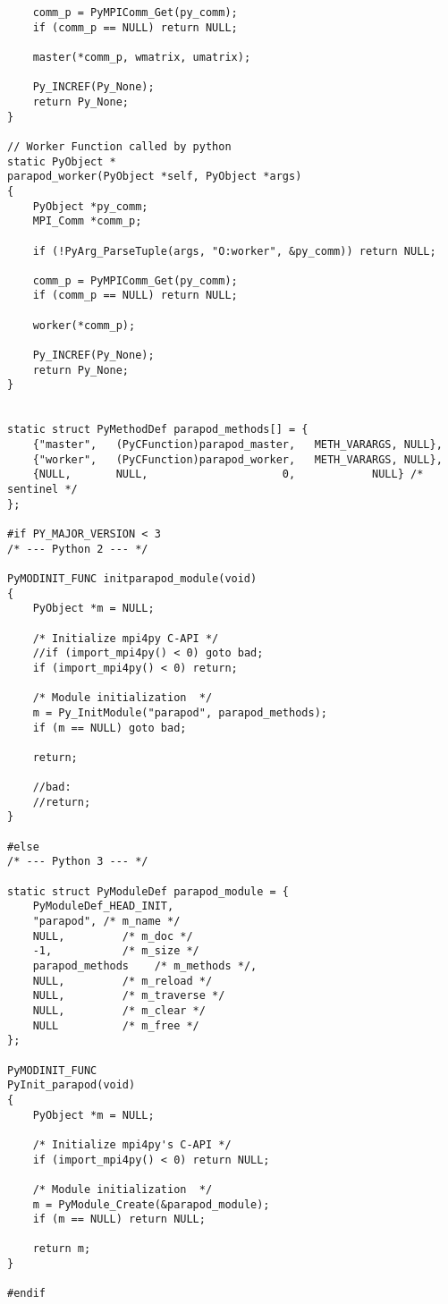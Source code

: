 \begin{lstlisting}
	comm_p = PyMPIComm_Get(py_comm);
	if (comm_p == NULL) return NULL;
	
	master(*comm_p, wmatrix, umatrix);
	
	Py_INCREF(Py_None);
	return Py_None;
}

// Worker Function called by python
static PyObject *
parapod_worker(PyObject *self, PyObject *args)
{
	PyObject *py_comm;
	MPI_Comm *comm_p;
	
	if (!PyArg_ParseTuple(args, "O:worker", &py_comm)) return NULL;
	
	comm_p = PyMPIComm_Get(py_comm);
	if (comm_p == NULL) return NULL;
	
	worker(*comm_p);
	
	Py_INCREF(Py_None);
	return Py_None;
}


static struct PyMethodDef parapod_methods[] = {
	{"master",   (PyCFunction)parapod_master,   METH_VARARGS, NULL},
	{"worker",   (PyCFunction)parapod_worker,   METH_VARARGS, NULL},
	{NULL,       NULL,                     0,            NULL} /* sentinel */
};

#if PY_MAJOR_VERSION < 3
/* --- Python 2 --- */

PyMODINIT_FUNC initparapod_module(void)
{
	PyObject *m = NULL;
	
	/* Initialize mpi4py C-API */
	//if (import_mpi4py() < 0) goto bad;
	if (import_mpi4py() < 0) return;
	
	/* Module initialization  */
	m = Py_InitModule("parapod", parapod_methods);
	if (m == NULL) goto bad;
	
	return;
	
	//bad:
	//return;
}

#else
/* --- Python 3 --- */

static struct PyModuleDef parapod_module = {
	PyModuleDef_HEAD_INIT,
	"parapod", /* m_name */
	NULL,         /* m_doc */
	-1,           /* m_size */
	parapod_methods    /* m_methods */,
	NULL,         /* m_reload */
	NULL,         /* m_traverse */
	NULL,         /* m_clear */
	NULL          /* m_free */
};

PyMODINIT_FUNC
PyInit_parapod(void)
{
	PyObject *m = NULL;
	
	/* Initialize mpi4py's C-API */
	if (import_mpi4py() < 0) return NULL;
	
	/* Module initialization  */
	m = PyModule_Create(&parapod_module);
	if (m == NULL) return NULL;
	
	return m;
}

#endif
\end{lstlisting}


